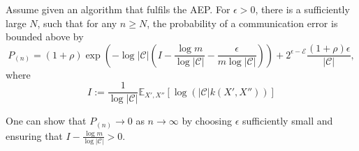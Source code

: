 \begin{theorem}
Assume given an algorithm that fulfils the AEP.
For $\epsilon > 0$, there is a sufficiently large $N$, such that for any $n \geq N$, the probability of a communication error is bounded above by 
%
\begin{equation}
P_{(n)} = \left(1 + \rho\right)\exp\left(-\log\left|\mathcal{C}\right|\left(I - \frac{\log m}{\log \left|\mathcal{C}\right|} -  \frac{\epsilon}{m\log \left|\mathcal{C}\right|}\right)\right) + 2^{\epsilon - \mathcal{E}}\frac{\left(1 + \rho\right)\epsilon}{\left|\mathcal{C}\right|},
\label{eq:prob_comm_error_empirical_var}
\end{equation}
%
where
%
\begin{equation}
I := \frac{1}{\log\left|\mathcal{C}\right|}\mathbb{E}_{X', X''}\left[\log \left(\left|\mathcal{C}\right|k(X', X'')\right)\right]
\label{eq:exp_log_pa}
\end{equation}
%
\label{thm:comm_error_emp_var}
\end{theorem}

One can show that $P_{(n)} \to 0$ as $n \to \infty$ by choosing $\epsilon$ sufficiently small and ensuring that $I - \frac{\log m}{\log \left|\mathcal{C}\right|} > 0$.

